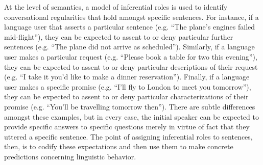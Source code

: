 At the level of semantics, a model of inferential roles is used to identify conversational regularities that hold amongst specific sentences. For instance, if a language user that asserts a particular sentence (e.g. ``The plane's engines failed mid-flight''), they can be expected to assent to or deny particular further sentences (e.g. ``The plane did not arrive as scheduled''). Similarly, if a language user makes a particular request (e.g. ``Please book a table for two this evening''), they can be expected to assent to or deny particular descriptions of their request (e.g. ``I take it you'd like to make a dinner reservation''). Finally, if a language user makes a specific promise (e.g. ``I'll fly to London to meet you tomorrow''), they can be expected to assent to or deny particular characterizations of their promise (e.g. ``You'll be travelling tomorrow then''). There are subtle differences amongst these examples, but in every case, the initial speaker can be expected to provide specific answers to specific questions merely in virtue of fact that they uttered a specific sentence. The point of assigning inferential roles to sentences, then, is to codify these expectations and then use them to make concrete predictions concerning linguistic behavior. 

